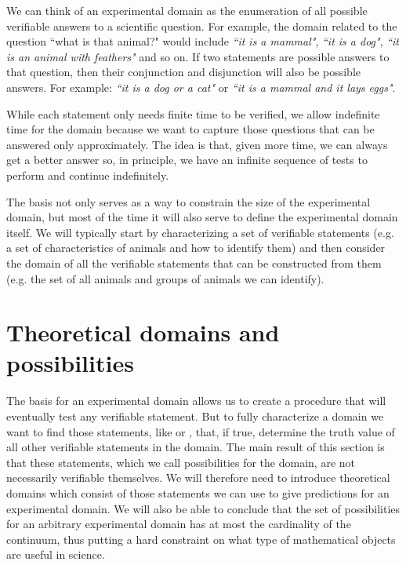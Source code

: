\documentclass[11pt,letterpaper,fleqn]{memoir} %
\begin{document}
We can think of an experimental domain as the enumeration of all possible verifiable answers to a scientific question. For example, the domain related to the question ``what is that animal?" would include \emph{``it is a mammal"}, \emph{``it is a dog"}, \emph{``it is an animal with feathers"} and so on. If two statements are possible answers to that question, then their conjunction and disjunction will also be possible answers. For example: \emph{``it is a dog or a cat"} or \emph{``it is a mammal and it lays eggs"}.

While each statement only needs finite time to be verified, we allow indefinite time for the domain because we want to capture those questions that can be answered only approximately. The idea is that, given more time, we can always get a better answer so, in principle, we have an infinite sequence of tests to perform and continue indefinitely.

The basis not only serves as a way to constrain the size of the experimental domain, but most of the time it will also serve to define the experimental domain itself. We will typically start by characterizing a set of verifiable statements (e.g. a set of characteristics of animals and how to identify them) and then consider the domain of all the verifiable statements that can be constructed from them (e.g. the set of all animals and groups of animals we can identify).

\section{Theoretical domains and possibilities}

The basis for an experimental domain allows us to create a procedure that will eventually test any verifiable statement. But to fully characterize a domain we want to find those statements, like  or , that, if true, determine the truth value of all other verifiable statements in the domain. The main result of this section is that these statements, which we call possibilities for the domain, are not necessarily verifiable themselves. We will therefore need to introduce theoretical domains which consist of those statements we can use to give predictions for an experimental domain. We will also be able to conclude that the set of possibilities for an arbitrary experimental domain has at most the cardinality of the continuum, thus putting a hard constraint on what type of mathematical objects are useful in science.
\end{document}

